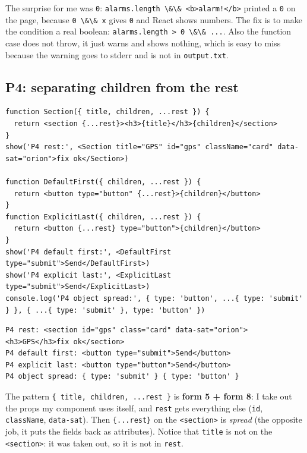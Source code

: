 The surprise for me was \passthrough{\lstinline!0!}: \passthrough{\lstinline"alarms.length \&\& <b>alarm!</b>"} printed a \passthrough{\lstinline!0!} on the page, because \passthrough{\lstinline!0 \&\& x!} gives \passthrough{\lstinline!0!} and React shows numbers. The fix is to make the condition a real boolean: \passthrough{\lstinline!alarms.length > 0 \&\& ...!}. Also the function case does not throw, it just warns and shows nothing, which is easy to miss because the warning goes to stderr and is not in \passthrough{\lstinline!output.txt!}.

\hypertarget{p4-separating-children-from-the-rest}{%
\subsection{P4: separating children from the rest}\label{p4-separating-children-from-the-rest}}

\begin{lstlisting}
function Section({ title, children, ...rest }) {
  return <section {...rest}><h3>{title}</h3>{children}</section>
}
show('P4 rest:', <Section title="GPS" id="gps" className="card" data-sat="orion">fix ok</Section>)

function DefaultFirst({ children, ...rest }) {
  return <button type="button" {...rest}>{children}</button>
}
function ExplicitLast({ children, ...rest }) {
  return <button {...rest} type="button">{children}</button>
}
show('P4 default first:', <DefaultFirst type="submit">Send</DefaultFirst>)
show('P4 explicit last:', <ExplicitLast type="submit">Send</ExplicitLast>)
console.log('P4 object spread:', { type: 'button', ...{ type: 'submit' } }, { ...{ type: 'submit' }, type: 'button' })
\end{lstlisting}

\begin{lstlisting}
P4 rest: <section id="gps" class="card" data-sat="orion"><h3>GPS</h3>fix ok</section>
P4 default first: <button type="submit">Send</button>
P4 explicit last: <button type="button">Send</button>
P4 object spread: { type: 'submit' } { type: 'button' }
\end{lstlisting}

The pattern \passthrough{\lstinline!\{ title, children, ...rest \}!} is \textbf{form 5 + form 8}: I take out the props my component uses itself, and \passthrough{\lstinline!rest!} gets everything else (\passthrough{\lstinline!id!}, \passthrough{\lstinline!className!}, \passthrough{\lstinline!data-sat!}). Then \passthrough{\lstinline!\{...rest\}!} on the \passthrough{\lstinline!<section>!} is \emph{spread} (the opposite job, it puts the fields back as attributes). Notice that \passthrough{\lstinline!title!} is not on the \passthrough{\lstinline!<section>!}: it was taken out, so it is not in \passthrough{\lstinline!rest!}.

